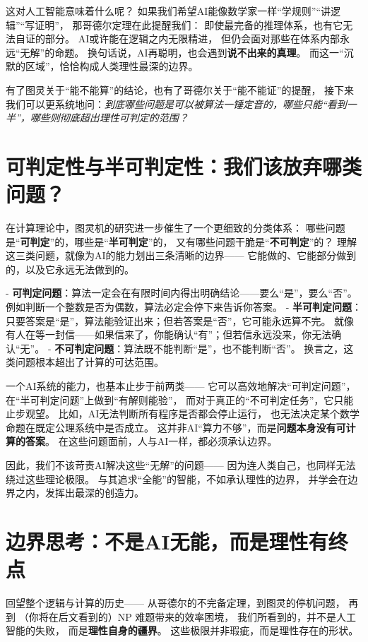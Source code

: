 这对人工智能意味着什么呢？  
如果我们希望AI能像数学家一样“学规则”“讲逻辑”“写证明”，  
那哥德尔定理在此提醒我们：  
即使最完备的推理体系，也有它无法自证的部分。  
AI或许能在逻辑之内无限精进，  
但仍会面对那些在体系内部永远“无解”的命题。  
换句话说，AI再聪明，也会遇到\textbf{说不出来的真理}。  
而这一“沉默的区域”，恰恰构成人类理性最深的边界。

有了图灵关于“能不能算”的结论，也有了哥德尔关于“能不能证”的提醒，  
接下来我们可以更系统地问：\textit{到底哪些问题是可以被算法一锤定音的，哪些只能“看到一半”，哪些则彻底超出理性可判定的范围？}

\section*{可判定性与半可判定性：我们该放弃哪类问题？}

在计算理论中，图灵机的研究进一步催生了一个更细致的分类体系：  
哪些问题是“\textbf{可判定}”的，哪些是“\textbf{半可判定}”的，  
又有哪些问题干脆是“\textbf{不可判定}”的？  
理解这三类问题，就像为AI的能力划出三条清晰的边界——  
它能做的、它能部分做到的，以及它永远无法做到的。

- \textbf{可判定问题}：算法一定会在有限时间内得出明确结论——要么“是”，要么“否”。  
  例如判断一个整数是否为偶数，算法必定会停下来告诉你答案。  
- \textbf{半可判定问题}：只要答案是“是”，算法能验证出来；但若答案是“否”，它可能永远算不完。  
  就像有人在等一封信——如果信来了，你能确认“有”；但若信永远没来，你无法确认“无”。  
- \textbf{不可判定问题}：算法既不能判断“是”，也不能判断“否”。  
  换言之，这类问题根本超出了计算的可达范围。

一个AI系统的能力，也基本止步于前两类——  
它可以高效地解决“可判定问题”，  
在“半可判定问题”上做到“有解则能验”，  
而对于真正的“不可判定任务”，它只能止步观望。  
比如，AI无法判断所有程序是否都会停止运行，  
也无法决定某个数学命题在既定公理系统中是否成立。  
这并非AI“算力不够”，而是\textbf{问题本身没有可计算的答案}。  
在这些问题面前，人与AI一样，都必须承认边界。

因此，我们不该苛责AI解决这些“无解”的问题——  
因为连人类自己，也同样无法绕过这些理论极限。  
与其追求“全能”的智能，不如承认理性的边界，  
并学会在边界之内，发挥出最深的创造力。

\section*{边界思考：不是AI无能，而是理性有终点}

回望整个逻辑与计算的历史——  
从哥德尔的不完备定理，到图灵的停机问题，  
再到 （你将在后文看到的）NP 难题带来的效率困境，  
我们所看到的，并不是人工智能的失败，  
而是\textbf{理性自身的疆界}。  
这些极限并非瑕疵，而是理性存在的形状。

